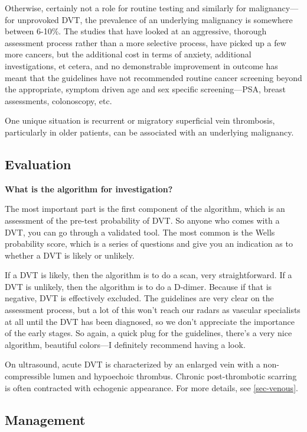 \documentclass[
]{book}
\begin{document}
Otherwise, certainly not a role for routine testing and similarly for
malignancy---for unprovoked DVT, the prevalence of an underlying
malignancy is somewhere between 6-10\%. The studies that have looked at
an aggressive, thorough assessment process rather than a more selective
process, have picked up a few more cancers, but the additional cost in
terms of anxiety, additional investigations, et cetera, and no
demonstrable improvement in outcome has meant that the guidelines have
not recommended routine cancer screening beyond the appropriate, symptom
driven age and sex specific screening---PSA, breast assessments,
colonoscopy, etc.

One unique situation is recurrent or migratory superficial vein
thrombosis, particularly in older patients, can be associated with an
underlying malignancy.\citep{litzendorf2011}

\hypertarget{evaluation-19}{%
\subsection{Evaluation}\label{evaluation-19}}

\textbf{What is the algorithm for investigation?}

The most important part is the first component of the algorithm, which
is an assessment of the pre-test probability of DVT. So anyone who comes
with a DVT, you can go through a validated tool. The most common is the
Wells probability score, which is a series of questions and give you an
indication as to whether a DVT is likely or unlikely. \citep{tritschler2018}

If a DVT is likely, then the algorithm is to do a scan, very
straightforward. If a DVT is unlikely, then the algorithm is to do a
D-dimer. Because if that is negative, DVT is effectively excluded. The
guidelines are very clear on the assessment process, but a lot of this
won't reach our radars as vascular specialists at all until the DVT has
been diagnosed, so we don't appreciate the importance of the early
stages. So again, a quick plug for the guidelines, there's a very nice
algorithm, beautiful colors---I definitely recommend having a look.

On ultrasound, acute DVT is characterized by an enlarged vein with a
non-compressible lumen and hypoechoic thrombus. Chronic post-thrombotic
scarring is often contracted with echogenic appearance.\citep{yusof2019} For
more details, see \ref{sec-venous}.

\hypertarget{management-30}{%
\subsection{Management}\label{management-30}}
\end{document}
